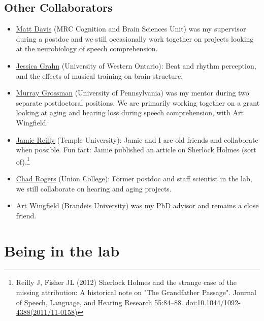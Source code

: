 \documentclass[letterpaper,12pt,oneside]{memoir}
\begin{document}
\section{Other Collaborators}
\begin{itemize}

\item{\href{http://www.mrc-cbu.cam.ac.uk/people/matt.davis/}{Matt Davis} (MRC Cognition and Brain Sciences Unit) was my supervisor during a postdoc and we still occasionally work together on projects looking at the neurobiology of speech comprehension.}

\item{\href{http://www.jessicagrahn.com}{Jessica Grahn} (University of Western Ontario): Beat and rhythm perception, and the effects of musical training on brain structure.}

\item{\href{http://ftd.med.upenn.edu/}{Murray Grossman} (University of Pennsylvania) was my mentor during two separate postdoctoral positions. We are primarily working together on a grant looking at aging and hearing loss during speech comprehension, with Art Wingfield.}

\item{\href{http://www.reilly-coglab.com}{Jamie Reilly} (Temple University): Jamie and I are old friends and collaborate when possible. Fun fact: Jamie published an article on Sherlock Holmes (sort of).\footnote{Reilly J, Fisher JL (2012) Sherlock Holmes and the strange case of the missing attribution: A historical note on "The Grandfather Passage". Journal of Speech, Language, and Hearing Research 55:84--88. \href{http://dx.doi.org/10.1044/1092-4388(2011/11-0158)}{doi:10.1044/1092-4388(2011/11-0158)}}}

\item{\href{http://www.chadsrogers.com}{Chad Rogers} (Union College): Former postdoc and staff scientist in the lab, we still collaborate on hearing and aging projects.}

\item{\href{http://www.bio.brandeis.edu/faculty/wingfield.html}{Art Wingfield} (Brandeis University) was my PhD advisor and remains a close friend.}
\end{itemize}



\chapter{Being in the lab}
\end{document}

